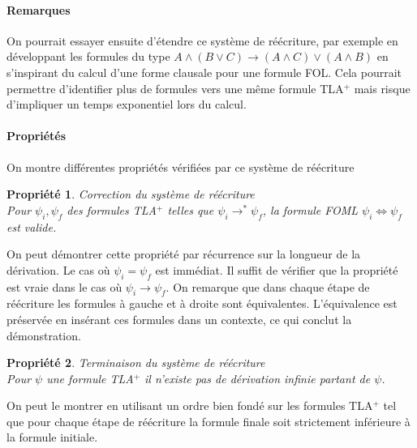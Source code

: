 \documentclass[12pt]{article}
\newtheorem{prop}{Propriété}
\begin{document}
\paragraph{Remarques}

On pourrait essayer ensuite d'étendre ce système de réécriture, par exemple en développant les formules du type $A \land (B \lor C) \longrightarrow (A \land C) \lor (A \land B)$ en s'inspirant du calcul d'une forme clausale pour une formule FOL.
Cela pourrait permettre d'identifier plus de formules vers une même formule TLA$^+$ mais risque d'impliquer un temps exponentiel lors du calcul.


\paragraph{Propriétés}

On montre différentes propriétés vérifiées par ce système de réécriture

\begin{prop} \emph{Correction du système de réécriture} \\
  Pour $\psi_i, \psi_f$ des formules TLA$^+$ telles que $\psi_i \longrightarrow^* \psi_f$,
  la formule FOML $\psi_i \Leftrightarrow \psi_f$ est valide.
\end{prop}

On peut démontrer cette propriété par récurrence sur la longueur de la dérivation.
Le cas où $\psi_i = \psi_f$ est immédiat. Il suffit de vérifier que la propriété est vraie dans le cas où $\psi_i \longrightarrow \psi_f$.
On remarque que dans chaque étape de réécriture les formules à gauche et à droite sont équivalentes.
L'équivalence est préservée en insérant ces formules dans un contexte,
ce qui conclut la démonstration.

\begin{prop} \emph{Terminaison du système de réécriture} \\
  Pour $\psi$ une formule TLA$^+$ il n'existe pas de dérivation infinie partant de $\psi$.
\end{prop}

On peut le montrer en utilisant un ordre bien fondé sur les formules TLA$^+$ tel que pour chaque étape de réécriture la formule finale soit strictement inférieure à la formule initiale.
\end{document}
